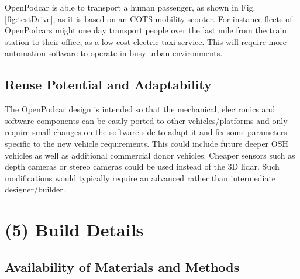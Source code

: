 \documentclass[a4paper]{article}
\begin{document}
	OpenPodcar is able to transport a human passenger, as shown in Fig. \ref{fig:testDrive}, as it is based on an COTS mobility scooter.  For instance fleets of OpenPodcars might one day transport people over the last mile from the train station to their office, as a low cost electric taxi service. This will require more automation software to operate in busy urban environments.
	
	\subsection{Reuse Potential and Adaptability}\label{h.6wkumyl0ejrh}
	
	The OpenPodcar design is intended so that the mechanical, electronics and software components can be easily ported to other vehicles/platforms and only require small changes on the software side to adapt it and fix some parameters specific to the new vehicle requirements. This could include future deeper OSH vehicles as well as additional commercial donor vehicles. Cheaper sensors such as depth cameras or stereo cameras could be used instead of the 3D lidar. Such modifications would typically require an advanced rather than intermediate designer/builder.
	
	
	
	
	
	
	\section{(5) Build Details}\label{h.l8i9vokvs0bj}
	
	\subsection{Availability of Materials and Methods}\label{h.60suejv0jlzi}
	
\end{document}
